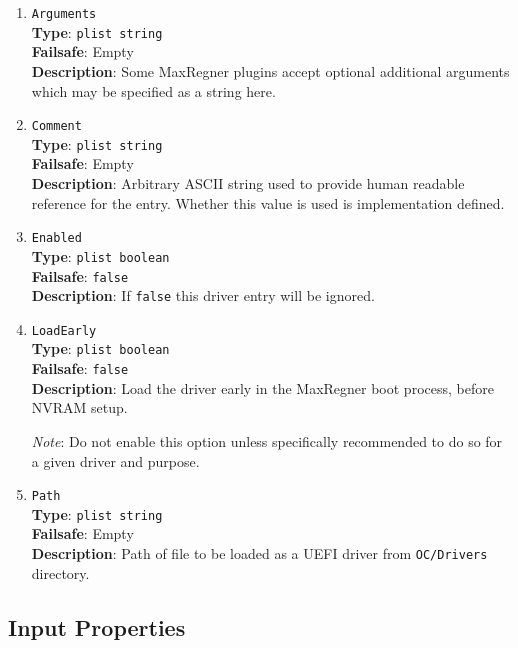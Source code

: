 \documentclass[]{article}
\begin{document}
\begin{enumerate}

\item
  \texttt{Arguments}\\
  \textbf{Type}: \texttt{plist\ string}\\
  \textbf{Failsafe}: Empty\\
  \textbf{Description}: Some MaxRegner plugins accept optional additional arguments
  which may be specified as a string here.

\item
  \texttt{Comment}\\
  \textbf{Type}: \texttt{plist\ string}\\
  \textbf{Failsafe}: Empty\\
  \textbf{Description}: Arbitrary ASCII string used to provide human readable
  reference for the entry. Whether this value is used is implementation defined.

\item
  \texttt{Enabled}\\
  \textbf{Type}: \texttt{plist\ boolean}\\
  \textbf{Failsafe}: \texttt{false}\\
  \textbf{Description}: If \texttt{false} this driver entry will be ignored.

\item
  \texttt{LoadEarly}\\
  \textbf{Type}: \texttt{plist\ boolean}\\
  \textbf{Failsafe}: \texttt{false}\\
  \textbf{Description}: Load the driver early in the MaxRegner boot process, before NVRAM setup.

  \emph{Note}: Do not enable this option unless specifically recommended to do so for a
  given driver and purpose.

\item
  \texttt{Path}\\
  \textbf{Type}: \texttt{plist\ string}\\
  \textbf{Failsafe}: Empty\\
  \textbf{Description}: Path of file to be loaded as a UEFI driver
  from \texttt{OC/Drivers} directory.

\end{enumerate}


\subsection{Input Properties}\label{uefiinputprops}
\end{document}
